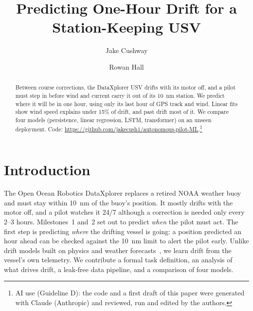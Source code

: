 \documentclass[sigconf]{acmart}
\begin{document}
\title{Predicting One-Hour Drift for a Station-Keeping USV}
\author{Jake Cushway}

\author{Rowan Hall}

\begin{abstract}
Between course corrections, the DataXplorer\texttrademark{} USV drifts with its motor off, and a pilot must step in before wind and current carry it out of its 10~nm station. We predict where it will be in one hour, using only its last hour of GPS track and wind. Linear fits show wind speed explains under 15\% of drift, and past drift most of it. We compare four models (persistence, linear regression, LSTM, transformer) on an unseen deployment. Code: \url{https://github.com/jakecush1/autonomous-pilot-ML}.\footnote{AI use (Guideline D): the code and a first draft of this paper were generated with Claude (Anthropic) and reviewed, run and edited by the authors.}
\end{abstract}

\maketitle
\pagestyle{empty}

\section{Introduction}\label{sec:intro}
The Open Ocean Robotics DataXplorer replaces a retired NOAA weather buoy and must stay within 10~nm of the buoy's position. It mostly drifts with the motor off, and a pilot watches it 24/7 although a correction is needed only every 2--3 hours. Milestones~1 and~2 set out to predict \emph{when} the pilot must act. The first step is predicting \emph{where} the drifting vessel is going: a position predicted an hour ahead can be checked against the 10~nm limit to alert the pilot early. Unlike drift models built on physics and weather forecasts~\cite{dugan2024drifting,song2024drift}, we learn drift from the vessel's own telemetry. We contribute a formal task definition, an analysis of what drives drift, a leak-free data pipeline, and a comparison of four models.
\end{document}
